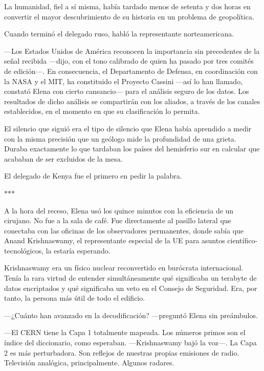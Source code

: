 \documentclass[11pt,a5paper,twoside]{book}
\begin{document}
La humanidad, fiel a sí misma, había tardado menos de setenta y dos horas en convertir el mayor descubrimiento de su historia en un problema de geopolítica.

Cuando terminó el delegado ruso, habló la representante norteamericana.

—Los Estados Unidos de América reconocen la importancia sin precedentes de la señal recibida —dijo, con el tono calibrado de quien ha pasado por tres comités de edición—. En consecuencia, el Departamento de Defensa, en coordinación con la NASA y el MIT, ha constituido el Proyecto Cassini —así lo han llamado, constató Elena con cierto cansancio— para el análisis seguro de los datos. Los resultados de dicho análisis se compartirán con los aliados, a través de los canales establecidos, en el momento en que su clasificación lo permita.

El silencio que siguió era el tipo de silencio que Elena había aprendido a medir con la misma precisión que un geólogo mide la profundidad de una grieta. Duraba exactamente lo que tardaban los países del hemisferio sur en calcular que acababan de ser excluidos de la mesa.

El delegado de Kenya fue el primero en pedir la palabra.

\vspace{1.5em}
\begin{center}$\ast$\quad$\ast$\quad$\ast$\end{center}
\vspace{1.5em}

A la hora del receso, Elena usó los quince minutos con la eficiencia de un cirujano. No fue a la sala de café. Fue directamente al pasillo lateral que conectaba con las oficinas de los observadores permanentes, donde sabía que Anand Krishnaswamy, el representante especial de la UE para asuntos científico-tecnológicos, la estaría esperando.

Krishnaswamy era un físico nuclear reconvertido en burócrata internacional. Tenía la rara virtud de entender simultáneamente qué significaba un terabyte de datos encriptados y qué significaba un veto en el Consejo de Seguridad. Era, por tanto, la persona más útil de todo el edificio.

—¿Cuánto han avanzado en la decodificación? —preguntó Elena sin preámbulos.

—El CERN tiene la Capa 1 totalmente mapeada. Los números primos son el índice del diccionario, como esperaban. —Krishnaswamy bajó la voz—. La Capa 2 es más perturbadora. Son reflejos de nuestras propias emisiones de radio. Televisión analógica, principalmente. Algunos radares.
\end{document}
